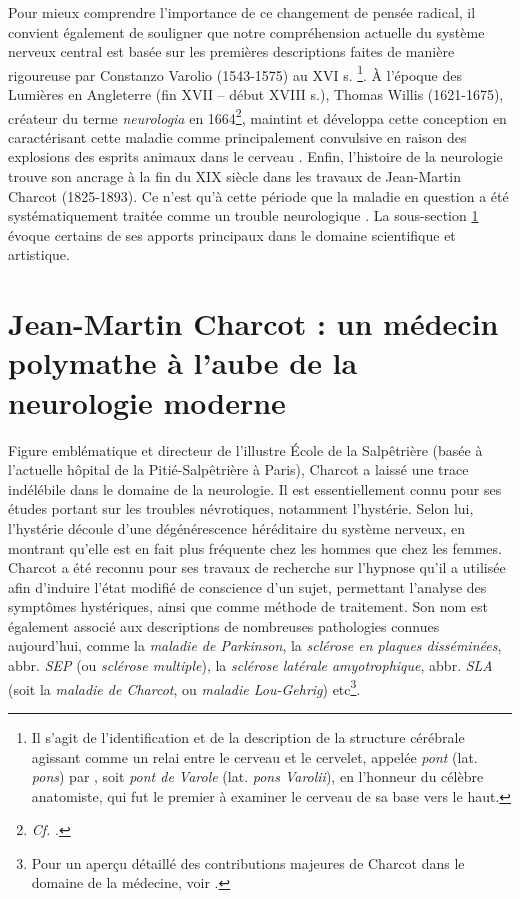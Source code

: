 Pour mieux comprendre l'importance de ce changement de pensée radical, il convient également de souligner que notre compréhension actuelle du système nerveux central est basée sur les premières descriptions faites de manière rigoureuse par Constanzo Varolio (1543-1575) au XVI\ieme{} s. \citep{tubbs2008costanzo}\footnote{Il s'agit de l'identification et de la description de la structure cérébrale agissant comme un relai entre le cerveau et le cervelet, appelée \textit{pont} (lat. \textit{pons}) par \citet{varolio1969nervis}, soit \textit{pont de Varole} (lat. \textit{pons Varolii}), en l'honneur du célèbre anatomiste, qui fut le premier à examiner le cerveau de sa base vers le haut.  
}. À l'époque des Lumières en Angleterre (fin XVII\ieme{} -- début XVIII\ieme{} s.), Thomas Willis (1621-1675), créateur du terme \textit{neurologia} en 1664\footnote{\textit{Cf.} \citet{willis1664cerebri}.}, maintint et développa cette conception en caractérisant cette maladie comme principalement convulsive en raison des explosions des \og{}esprits animaux\fg{} dans le cerveau \citep{willis1681essay}. Enfin, l'histoire de la neurologie trouve son ancrage à la fin du XIX\ieme{} siècle dans les travaux de Jean-Martin Charcot (1825-1893). Ce n'est qu'à cette période que la maladie en question a été systématiquement traitée comme un trouble neurologique \citep{tasca2012women}. La sous-section \ref{JMC_polymathe} évoque certains de ses apports principaux dans le domaine scientifique et artistique.

\section{Jean-Martin Charcot : un médecin polymathe à l'aube de la neurologie moderne}
\label{JMC_polymathe}

Figure emblématique et directeur de l'illustre École de la Salpêtrière (basée à l'actuelle hôpital  de la Pitié-Salpêtrière à Paris), Charcot a laissé une trace indélébile dans le domaine de la neurologie. 
Il est essentiellement connu pour ses études portant sur les troubles névrotiques, notamment l'hystérie. Selon lui, l'hystérie découle d'une dégénérescence héréditaire du système nerveux, en montrant qu'elle est en fait plus fréquente chez les hommes que chez les femmes. Charcot a été reconnu pour ses travaux de recherche sur l'hypnose qu'il a utilisée afin d'induire l'état modifié de conscience d'un sujet, permettant l'analyse des symptômes hystériques, ainsi que comme méthode de traitement. 
Son nom est également associé aux descriptions de nombreuses pathologies connues aujourd'hui, comme la \textit{maladie de Parkinson}, la \textit{sclérose en plaques disséminées}, abbr. \textit{SEP} (ou \textit{sclérose multiple}), la \textit{sclérose latérale amyotrophique}, abbr. \textit{SLA} (soit la \textit{maladie de Charcot}, ou \textit{maladie Lou-Gehrig}) etc\footnote{Pour un aperçu détaillé des contributions majeures de Charcot dans le domaine de la médecine, voir \citet{camargo2024}.}.

